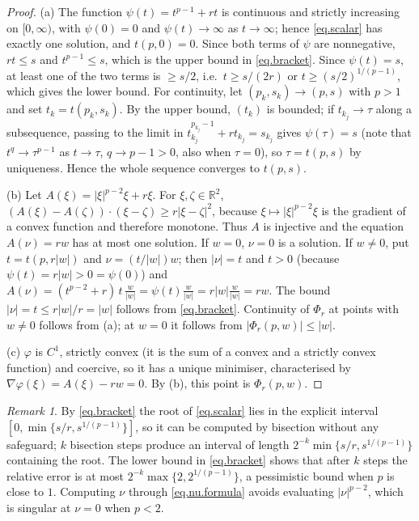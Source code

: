 \documentclass[11pt]{amsart}
\newcommand{\R}{\mathbb R}
\theoremstyle{definition}
\theoremstyle{remark}
\newtheorem{remark}[teo]{Remark}
\numberwithin{equation}{section}
\begin{document}
\begin{proof}
(a) The function $\psi(t)=t^{p-1}+rt$ is continuous and strictly increasing on $[0,\infty)$, with $\psi(0)=0$ and $\psi(t)\to\infty$ as $t\to\infty$; hence \eqref{eq.scalar} has exactly one solution, and $t(p,0)=0$. Since both terms of $\psi$ are nonnegative, $rt\le s$ and $t^{p-1}\le s$, which is the upper bound in \eqref{eq.bracket}. Since $\psi(t)=s$, at least one of the two terms is $\ge s/2$, i.e.\ $t\ge s/(2r)$ or $t\ge (s/2)^{1/(p-1)}$, which gives the lower bound. For continuity, let $(p_k,s_k)\to(p,s)$ with $p>1$ and set $t_k=t(p_k,s_k)$. By the upper bound, $(t_k)$ is bounded; if $t_{k_j}\to\tau$ along a subsequence, passing to the limit in $t_{k_j}^{p_{k_j}-1}+rt_{k_j}=s_{k_j}$ gives $\psi(\tau)=s$ (note that $t^{q}\to\tau^{p-1}$ as $t\to\tau$, $q\to p-1>0$, also when $\tau=0$), so $\tau=t(p,s)$ by uniqueness. Hence the whole sequence converges to $t(p,s)$.

(b) Let $A(\xi)=|\xi|^{p-2}\xi+r\xi$. For $\xi,\zeta\in\R^2$, $(A(\xi)-A(\zeta))\cdot(\xi-\zeta)\ge r|\xi-\zeta|^2$, because $\xi\mapsto|\xi|^{p-2}\xi$ is the gradient of a convex function and therefore monotone. Thus $A$ is injective and the equation $A(\nu)=rw$ has at most one solution. If $w=0$, $\nu=0$ is a solution. If $w\ne0$, put $t=t(p,r|w|)$ and $\nu=(t/|w|)w$; then $|\nu|=t$ and
$t>0$ (because $\psi(t)=r|w|>0=\psi(0)$) and
$A(\nu)=(t^{p-2}+r)\,t\,\frac{w}{|w|}=\psi(t)\frac{w}{|w|}=r|w|\frac{w}{|w|}=rw$. The bound $|\nu|=t\le r|w|/r=|w|$ follows from \eqref{eq.bracket}. Continuity of $\Phi_r$ at points with $w\ne0$ follows from (a); at $w=0$ it follows from $|\Phi_r(p,w)|\le|w|$.

(c) $\varphi$ is $C^1$, strictly convex (it is the sum of a convex and a strictly convex function) and coercive, so it has a unique minimiser, characterised by $\nabla\varphi(\xi)=A(\xi)-rw=0$. By (b), this point is $\Phi_r(p,w)$.
\end{proof}

\begin{remark}\label{rem.bisection}
By \eqref{eq.bracket} the root of \eqref{eq.scalar} lies in the explicit interval $[0,\min\{s/r,s^{1/(p-1)}\}]$, so it can be computed by bisection without any safeguard; $k$ bisection steps produce an interval of length $2^{-k}\min\{s/r,s^{1/(p-1)}\}$ containing the root. The lower bound in \eqref{eq.bracket} shows that after $k$ steps the relative error is at most $2^{-k}\max\{2,2^{1/(p-1)}\}$, a pessimistic bound when $p$ is close to $1$. Computing $\nu$ through \eqref{eq.nu.formula} avoids evaluating $|\nu|^{p-2}$, which is singular at $\nu=0$ when $p<2$.
\end{remark}
\end{document}
